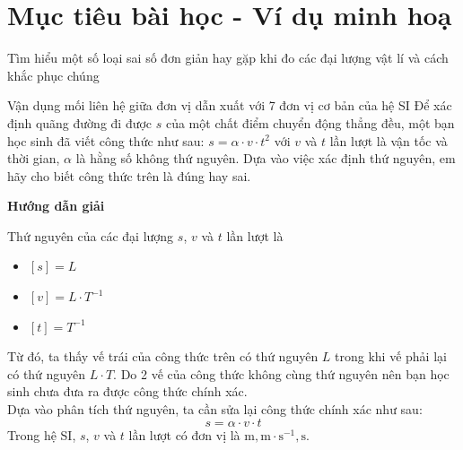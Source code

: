 \section{Mục tiêu bài học - Ví dụ minh hoạ}
\begin{dang}{Tìm hiểu một số loại sai số đơn giản hay gặp khi đo các đại lượng vật lí và cách khắc phục chúng}
\end{dang}
\begin{dang}{Vận dụng mối liên hệ giữa đơn vị dẫn xuất với 7 đơn vị cơ bản của hệ SI}
	{Để xác định quãng đường đi được $s$ của một chất điểm chuyển động thẳng đều, một bạn học sinh đã viết công thức như sau: $s=\alpha\cdot v\cdot t^2$ với $v$ và $t$ lần lượt là vận tốc và thời gian, $\alpha$ là hằng số không thứ nguyên. Dựa vào việc xác định thứ nguyên, em hãy cho biết công thức trên là đúng hay sai.
	}
{\begin{center}
		\textbf{Hướng dẫn giải}
	\end{center}
	Thứ nguyên của các đại lượng $s$, $v$ và $t$ lần lượt là
	\begin{itemize}
		\item $\left[s\right]=L$
		\item $\left[v\right]=L\cdot T^{-1}$
		\item $\left[t\right]=T^{-1}$
	\end{itemize}
Từ đó, ta thấy vế trái của công thức trên có thứ nguyên $L$ trong khi vế phải lại có thứ nguyên $L\cdot T$. Do 2 vế của công thức không cùng thứ nguyên nên bạn học sinh chưa đưa ra được công thức chính xác.\\
Dựa vào phân tích thứ nguyên, ta cần sửa lại công thức chính xác như sau:
$$s=\alpha \cdot v\cdot t$$
Trong hệ SI, $s$, $v$ và $t$ lần lượt có đơn vị là $\si{\meter}, \si{\meter\cdot\second^{-1}}, \si{\second}$.
}
	
\end{dang}
